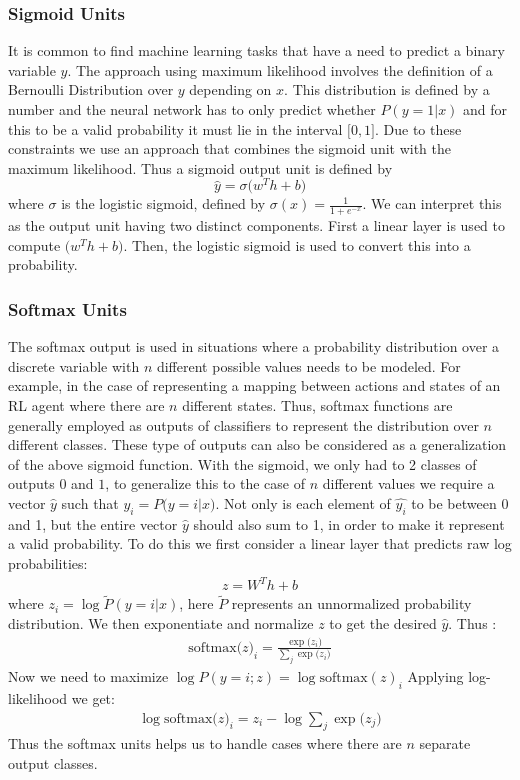 \documentclass[12pt]{extarticle}
\numberwithin{equation}{section}
\begin{document}
	\subsubsection{Sigmoid Units}		
	It is common to find machine learning tasks that have a need to predict a binary variable $y$. The approach using maximum likelihood involves the definition of a Bernoulli Distribution over $y$ depending on $x$. This distribution is defined by a number and the neural network has to only predict whether $P(y=1 | x)$ and for this to be a valid probability it must lie in the interval $\big[0,1\big]$. Due to these constraints we use an approach that combines the sigmoid unit with the maximum likelihood. Thus a sigmoid output unit is defined by 
	\begin{equation}
	\hat{y} = \sigma\big(w^T h + b\big)
	\end{equation}
	where $\sigma$ is the logistic sigmoid, defined by $\sigma(x) = \frac{1}{1 + e^{-x} }$. We can interpret this as the output unit having two distinct components. First a linear layer is used to compute $\big(w^T h + b\big)$. Then, the logistic sigmoid is used to convert this into a probability.
	\subsubsection{Softmax Units}		\label{softmax}
	The softmax output is used in situations where a probability distribution over a discrete variable with $n$ different possible values needs to be modeled. For example, in the case of representing a mapping between actions and states of an RL agent where there are $n$ different states. Thus, softmax functions are generally employed as outputs of classifiers to represent the distribution over $n$ different classes. These type of outputs can also be considered as a generalization of the above sigmoid function. With the sigmoid, we only had to 2 classes of outputs $0$ and $1$, to generalize this to the case of $n$ different values we require a vector $\hat{y}$ such that $\hat{y_i} = P\big(y=i | x\big)$. Not only is each element of $\hat{y_i}$ to be between 0 and 1, but the entire vector $\hat{y}$ should also sum to 1, in order to make it represent a valid probability. To do this we first consider a linear layer that predicts raw log probabilities:
	\begin{align}
	z = W^T h + b 
	\end{align} 
	where $z_i =\log \tilde{P}(y = i | x)$, here $\tilde{P}$ represents an unnormalized probability distribution. We then exponentiate and normalize $z$ to get the desired $\hat{y}$. Thus :
	\begin{align}
	\text{softmax}\big(z\big)_i = \frac{\exp\big(z_i\big)}{\sum_{j}\exp\big(z_i\big)}
	\end{align}
	Now we need to maximize $\log P(y=i;z) = \log \text{softmax}(z)_i $ Applying log-likelihood we get:
	\begin{align}
	\log \text{softmax}\big(z\big)_i = z_i - \log \sum_{j}\exp\big(z_j\big)
	\end{align}
	Thus the softmax units helps us to handle cases where there are $n$ separate output classes.
\end{document}
